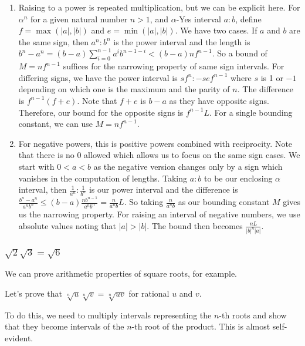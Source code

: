 \documentclass[12pt]{article}
\begin{document}
\begin{enumerate}
    \item Raising to a power is repeated multiplication, but we can be explicit here. For $\alpha^n$ for a given natural number $n>1$, and $\alpha$-Yes interval $a:b$, define $f = \max(|a|, |b|)$ and $e=\min(|a|,|b|)$.  We have two cases. If $a$ and $b$ are the same sign, then $a^n:b^n$ is the power interval and the length is $b^n - a^n = (b-a)\sum_{i=0}^{n-1} a^i b^{n-1-i} < (b-a)n f^{n-1}$. So a bound of $M= nf^{n-1}$ suffices for the narrowing property of same sign intervals. For differing signs, we have the power interval is $sf^n:-sef^{n-1}$ where $s$ is 1 or $-1$ depending on which one is the maximum and the parity of $n$. The difference is $f^{n-1} (f+e)$. Note that $f+e$ is $b-a$ as they have opposite signs. Therefore, our bound for the opposite signs is $f^{n-1} L$. For a single bounding constant, we can use $M = n f^{n-1}$.
    \item For negative powers, this is positive powers combined with reciprocity. Note that there is no 0 allowed which allows us to focus on the same sign cases. We start with $0 < a < b$ as the negative version changes only by a sign which vanishes in the computation of lengths.  Taking $a:b$ to be our enclosing $\alpha$ interval, then $\frac{1}{a^n} : \frac{1}{b^n}$ is our power interval and the difference is $\frac{b^n-a^n}{a^n b^n} \leq (b-a) \frac{n b^{n-1}}{a^n b^n} = \frac{n}{a^n b} L$. So taking $\frac{n}{a^n b}$ as our bounding constant $M$ gives us the narrowing property.  For raising an interval of negative numbers, we use absolute values noting that  $|a|>|b|$. The bound then becomes $\frac{nL}{|b|^n |a|}$.
\end{enumerate}

\subsubsection{\texorpdfstring{$\sqrt{2} \sqrt{3} = \sqrt{6}$}{sqrt2sqrt3eqsqrt6}}

We can prove arithmetic properties of square roots, for example. 

Let's prove that $\sqrt[n]{u} \sqrt[n]{v} = \sqrt[n]{uv}$  for rational $u$ and $v$. 

To do this, we need to multiply intervals representing the $n$-th roots and show that they become intervals of the $n$-th root of the product. This is almost self-evident. 
\end{document}
